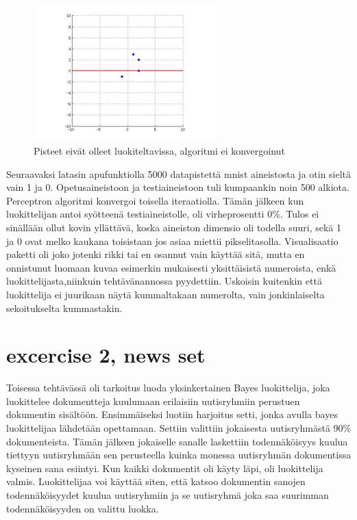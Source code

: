 \documentclass[a4paper,10pt]{article}
\begin{document}
\begin{figure}[ht!]
\includegraphics[width=70mm]{sanityCheck4.jpg}
\caption{Pisteet eivät olleet luokiteltavissa, algoritmi ei konvergoinut}

\label{overflow}
\end{figure}



Seuraavaksi latasin apufunktiolla 5000 datapistettä mnist aineistosta ja otin sieltä vain 1 ja 0.
Opetusaineistoon ja testiaineistoon tuli kumpaankin noin 500 alkiota. Perceptron algoritmi konvergoi toisella iteraatiolla. Tämän jälkeen kun luokittelijan
antoi syötteenä testiaineistolle, oli virheprosentti 0\%.
Tulos ei sinällään ollut kovin yllättävä, koska aineiston dimensio oli todella suuri, sekä 1 ja 0 ovat melko kaukana toisistaan jos asiaa miettii 
pikselitasolla. Visualisaatio paketti oli joko jotenki rikki tai en osannut vain käyttää sitä, mutta en onnistunut luomaan kuvaa esimerkin mukaisesti yksittäisistä
numeroista, enkä luokittelijasta,niinkuin tehtävänannossa pyydettiin. Uskoisin kuitenkin että luokittelija ei juurikaan näytä kummaltakaan numerolta, vain jonkinlaiselta
sekoitukselta kummastakin. 

\section{excercise 2, news set}

Toisessa tehtävässä oli tarkoitus luoda yksinkertainen Bayes luokittelija, joka luokittelee dokumentteja kuulumaan erilaisiin uutisryhmiin perustuen 
dokumentin sisältöön. 
Ensimmäiseksi luotiin harjoitus setti, jonka avulla bayes luokittelijaa lähdetään opettamaan. Settiin valittiin jokaisesta uutisryhmästä 90\% dokumenteista. 
Tämän jälkeen jokaiselle sanalle laskettiin todennäköisyys kuulua tiettyyn uutisryhmään sen perusteella kuinka monessa uutisryhmän dokumentissa kyseinen sana esiintyi. Kun kaikki 
dokumentit oli käyty läpi, oli luokittelija valmis. Luokittelijaa voi käyttää siten, että katsoo dokumentin sanojen todennäköisyydet kuulua uutisryhmiin ja se 
uutisryhmä joka saa suurimman todennäköisyyden on valittu luokka. 
\end{document}
